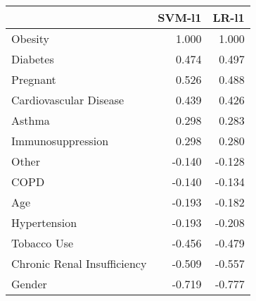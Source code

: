 \begin{tabular}{lrr}
\toprule
{} &  SVM-l1 &  LR-l1 \\
\midrule
Obesity                     &   1.000 &  1.000 \\
Diabetes                    &   0.474 &  0.497 \\
Pregnant                    &   0.526 &  0.488 \\
Cardiovascular Disease      &   0.439 &  0.426 \\
Asthma                      &   0.298 &  0.283 \\
Immunosuppression           &   0.298 &  0.280 \\
Other                       &  -0.140 & -0.128 \\
COPD                        &  -0.140 & -0.134 \\
Age                         &  -0.193 & -0.182 \\
Hypertension                &  -0.193 & -0.208 \\
Tobacco Use                 &  -0.456 & -0.479 \\
Chronic Renal Insufficiency &  -0.509 & -0.557 \\
Gender                      &  -0.719 & -0.777 \\
\bottomrule
\end{tabular}
